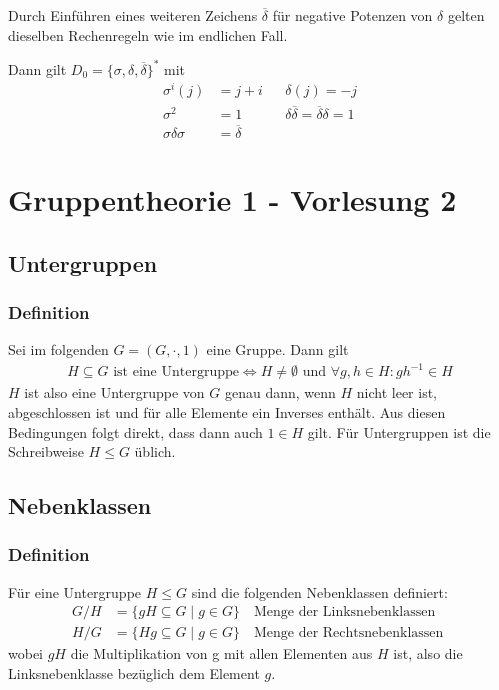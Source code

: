 \documentclass[12pt, german]{article}
\begin{document}
		Durch Einführen eines weiteren Zeichens $\overline{\delta}$ für negative Potenzen von $\delta$ gelten dieselben Rechenregeln wie im endlichen Fall.
		
		Dann gilt $D_0 = \{\sigma, \delta, \overline{\delta}\}^*$ mit
		\begin{align*}
			\sigma^i(j) & = j+i &&\delta(j)  = -j \\
			\sigma^2 & = 1 &&\delta\overline{\delta} = \overline{\delta}\delta = 1 \\
			\sigma\delta\sigma & = \overline{\delta}
		\end{align*}

	\section{Gruppentheorie 1 - Vorlesung 2}
	\subsection{Untergruppen}
	\subsubsection{Definition}
	Sei im folgenden $G=(G, \cdot, 1)$ eine Gruppe. Dann gilt 
	\begin{align*}
		H \subseteq G \text{ ist eine Untergruppe} \iff H \not = \emptyset \text{ und } \forall g, h \in H : gh^{-1} \in H
	\end{align*}
	$H$ ist also eine Untergruppe von $G$ genau dann, wenn $H$ nicht leer ist, abgeschlossen ist und für alle Elemente ein Inverses enthält. Aus diesen Bedingungen folgt direkt, dass dann auch $1 \in H$ gilt.
	Für Untergruppen ist die Schreibweise $H\leq G$ üblich.
	
	
	\subsection{Nebenklassen}
	\subsubsection{Definition}
	Für eine Untergruppe $H \leq G$ sind die folgenden Nebenklassen definiert:
	\begin{align*}
		G/H &= \{gH \subseteq G \mid g \in G\} \quad \text{Menge der Linksnebenklassen } \\
		H/G &= \{Hg \subseteq G \mid g \in G\} \quad \text{Menge der Rechtsnebenklassen } 
	\end{align*}
	wobei $gH$ die Multiplikation von  g mit allen Elementen aus $H$ ist, also die Linksnebenklasse bezüglich dem Element $g$. 
	
\end{document}
